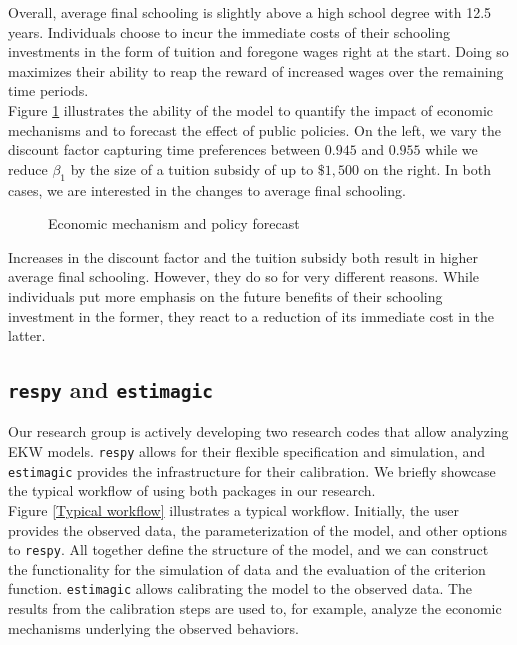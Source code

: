 \noindent Overall, average final schooling is slightly above a high school degree with 12.5 years. Individuals choose to incur the immediate costs of their schooling investments in the form of tuition and foregone wages right at the start. Doing so maximizes their ability to reap the reward of increased wages over the remaining time periods.\\

\noindent Figure \ref{Economic mechanism and policy forecast} illustrates the ability of the model to quantify the impact of economic mechanisms and to forecast the effect of public policies. On the left, we vary the discount factor capturing time preferences between $0.945$ and $0.955$ while we reduce $\beta_1$ by the size of a tuition subsidy of up to $\$1,500$ on the right. In both cases, we are interested in the changes to average final schooling.

\begin{figure}[h!]\centering
\caption{Economic mechanism and policy forecast}\label{Economic mechanism and policy forecast}
\hspace{0.3cm}
\end{figure}\FloatBarrier

\noindent Increases in the discount factor and the tuition subsidy both result in higher average final schooling. However, they do so for very different reasons. While individuals put more emphasis on the future benefits of their schooling investment in the former, they react to a reduction of its immediate cost in the latter.
\subsection{\texttt{respy} and \texttt{estimagic}}
Our research group is actively developing two research codes that allow analyzing EKW models. \verb+respy+ allows for their flexible specification and simulation, and \verb+estimagic+ provides the infrastructure for their calibration. We briefly showcase the typical workflow of using both packages in our research.\\

\noindent Figure \ref{Typical workflow} illustrates a typical workflow. Initially, the user provides the observed data, the parameterization of the model, and other options to \verb+respy+. All together define the structure of the model, and we can construct the functionality for the simulation of data and the evaluation of the criterion function. \verb+estimagic+ allows calibrating the model to the observed data. The results from the calibration steps are used to, for example, analyze the economic mechanisms underlying the observed behaviors.

